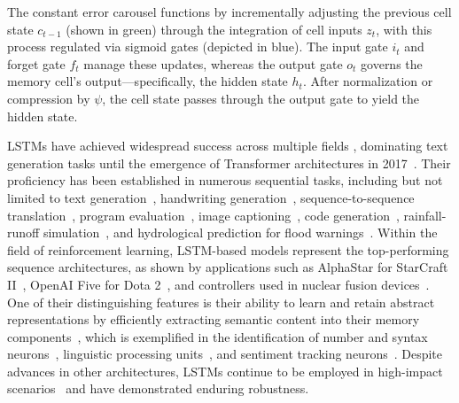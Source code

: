 The constant error carousel functions by incrementally adjusting the previous cell state $c_{t-1}$ (shown in green) through the integration of cell inputs $z_t$, with this process regulated via sigmoid gates (depicted in blue). The input gate $i_t$ and forget gate $f_t$ manage these updates, whereas the output gate $o_t$ governs the memory cell’s output—specifically, the hidden state $h_t$. After normalization or compression by $\psi$, the cell state passes through the output gate to yield the hidden state.

LSTMs have achieved widespread success across multiple fields \citep{Hochreiter:01,Hochreiter:07,Schmidhuber:15}, dominating text generation tasks until the emergence of Transformer architectures in 2017~\citep{Vaswani:17}. Their proficiency has been established in numerous sequential tasks, including but not limited to text generation~\citep{Graves:13,Karpathy:15blog}, handwriting generation~\citep{Graves:13}, sequence-to-sequence translation~\citep{Sutskever:14nips}, program evaluation~\citep{Zaremba:14arxiv}, image captioning~\citep{Karpathy:15,Hossain:19}, code generation~\citep{Karpathy:15blog}, rainfall-runoff simulation~\citep{Kratzert:18,Kratzert:19}, and hydrological prediction for flood warnings~\citep{Nearing:24}. Within the field of reinforcement learning, LSTM-based models represent the top-performing sequence architectures, as shown by applications such as AlphaStar for StarCraft II~\citep{Vinyals:17short}, OpenAI Five for Dota 2~\citep{OpenAI:19}, and controllers used in nuclear fusion devices~\citep{Degrave:22short}. One of their distinguishing features is their ability to learn and retain abstract representations by efficiently extracting semantic content into their memory components~\citep{Karpathy:15blog}, which is exemplified in the identification of number and syntax neurons~\citep{Lakretz:19}, linguistic processing units~\citep{Bau:19}, and sentiment tracking neurons~\citep{Radford:17arxiv}. Despite advances in other architectures, LSTMs continue to be employed in high-impact scenarios~\citep{Degrave:22short,Nearing:24} and have demonstrated enduring robustness.

